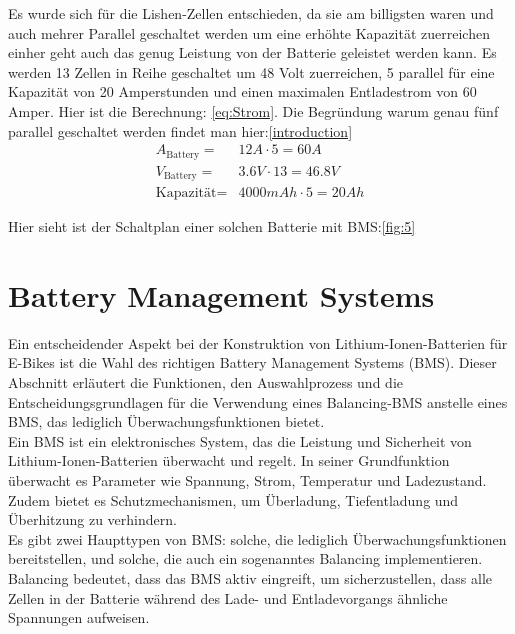Es wurde sich für die Lishen-Zellen entschieden, da sie am billigsten waren und auch mehrer Parallel geschaltet werden um eine erhöhte Kapazität zuerreichen einher geht auch das genug Leistung von der Batterie geleistet werden kann. Es werden 13 Zellen in Reihe geschaltet um 48 Volt zuerreichen, 5 parallel für eine Kapazität von 20 Amperstunden und einen maximalen Entladestrom von 60 Amper. Hier ist die Berechnung: \ref*{eq:Strom}. Die Begründung warum genau fünf parallel geschaltet werden findet man hier:\ref{introduction}\\

\begin{align}
    A_{\textrm{Battery}} =& 12 A\cdot 5 = 60 A\\
    V_{\textrm{Battery}} =& 3.6V \cdot 13 = 46.8V\\
    \textrm{Kapazität} =& 4000mAh \cdot 5 = 20 Ah
    \label{eq:Strom}
\end{align}

Hier sieht ist der Schaltplan einer solchen Batterie mit BMS:\ref{fig:5}




\section{Battery Management Systems}
Ein entscheidender Aspekt bei der Konstruktion von Lithium-Ionen-Batterien für E-Bikes ist die Wahl des richtigen Battery Management Systems (BMS). Dieser Abschnitt erläutert die Funktionen, den Auswahlprozess und die Entscheidungsgrundlagen für die Verwendung eines Balancing-BMS anstelle eines BMS, das lediglich Überwachungsfunktionen bietet.\\
Ein BMS ist ein elektronisches System, das die Leistung und Sicherheit von Lithium-Ionen-Batterien überwacht und regelt. In seiner Grundfunktion überwacht es Parameter wie Spannung, Strom, Temperatur und Ladezustand. Zudem bietet es Schutzmechanismen, um Überladung, Tiefentladung und Überhitzung zu verhindern.\\
Es gibt zwei Haupttypen von BMS: solche, die lediglich Überwachungsfunktionen bereitstellen, und solche, die auch ein sogenanntes Balancing implementieren. Balancing bedeutet, dass das BMS aktiv eingreift, um sicherzustellen, dass alle Zellen in der Batterie während des Lade- und Entladevorgangs ähnliche Spannungen aufweisen.\\


